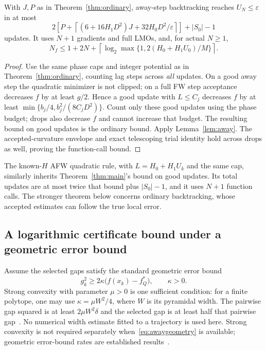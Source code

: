 \begin{theorem}\label{thm:awayconvex}
With $J,P$ as in Theorem~\ref{thm:ordinary}, away-step backtracking
reaches $U_N\le\varepsilon$ in at most
\[
 2\left[P+\left\lceil(6+16H_1D^2)J+32H_0D^2/\varepsilon\right\rceil\right]
 +|S_0|-1
\]
updates. It uses $N+1$ gradients and full LMOs, and, for actual $N\ge1$,
\[
 N_f\le1+2N+\left\lceil\log_2\max\{1,2(H_0+H_1U_0)/M\}\right\rceil.
\]
\end{theorem}
\begin{proof}
Use the same phase caps and integer potential as in
Theorem~\ref{thm:ordinary}, counting lag steps across \emph{all} updates.
On a good away step the quadratic minimizer is not clipped; on a full
FW step acceptance decreases $f$ by at least $g/2$. Hence a good update
with $L\le C_j$ decreases $f$ by at least
$\min\{b_j/4,b_j^2/(8C_jD^2)\}$. Count only these good updates using
the phase budget; drops also decrease $f$ and cannot increase that
budget. The resulting bound on good updates is the ordinary bound.
Apply Lemma~\ref{lem:away}. The accepted-curvature envelope and exact
telescoping trial identity hold across drops as well, proving the
function-call bound.
\end{proof}
The known-$H$ AFW quadratic rule, with $L=H_0+H_1U_k$ and the same
cap, similarly inherits Theorem~\ref{thm:main}'s bound on good updates.
Its total updates are at most twice that bound plus $|S_0|-1$, and it
uses $N+1$ function calls. The stronger theorem below concerns ordinary
backtracking, whose accepted estimates can follow the true local error.

\subsection{A logarithmic certificate bound under a geometric error bound}
Assume the selected gaps satisfy the standard geometric error bound
\begin{equation}\label{eq:awaygeometry}
 g_k^2\ge 2\kappa\bigl(f(x_k)-f_Q^*\bigr),\qquad\kappa>0.
\end{equation}
Strong convexity with parameter $\mu>0$ is one sufficient condition:
for a finite polytope, one may use
$\kappa=\mu W^2/4$, where $W$ is its pyramidal width. The pairwise
gap squared is at least $2\mu W^2\delta$ and the selected gap is at
least half that pairwise gap~\cite{lacostejaggi,pedregosa}.
No numerical width estimate fitted to a trajectory is used here.
Strong convexity is not required separately when~\eqref{eq:awaygeometry}
is available; geometric error-bound rates are established
results~\cite{wirth,restartfw}.

